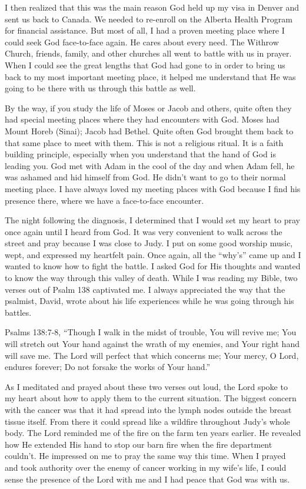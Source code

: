 \documentclass[twoside, 12pt]{book}
\begin{document}
I then realized that this was the main reason God held up my visa in Denver and sent us back to Canada. We needed to re-enroll on the Alberta Health Program for financial assistance. But most of all, I had a proven meeting place where I could seek God face-to-face again. He cares about every need. The Withrow Church, friends, family, and other churches all went to battle with us in prayer. When I could see the great lengths that God had gone to in order to bring us back to my most important meeting place, it helped me understand that He was going to be there with us through this battle as well. 

By the way, if you study the life of Moses or Jacob and others, quite often they had special meeting places where they had encounters with God. Moses had Mount Horeb (Sinai); Jacob had Bethel. Quite often God brought them back to that same place to meet with them. This is not a religious ritual. It is a faith building principle, especially when you understand that the hand of God is leading you. God met with Adam in the cool of the day and when Adam fell, he was ashamed and hid himself from God. He didn’t want to go to their normal meeting place. I have always loved my meeting places with God because I find his presence there, where we have a face-to-face encounter.

The night following the diagnosis, I determined that I would set my heart to pray once again until I heard from God. It was very convenient to walk across the street and pray because I was close to Judy. I put on some good worship music, wept, and expressed my heartfelt pain. Once again, all the “why’s” came up and I wanted to know how to fight the battle. I asked God for His thoughts and wanted to know the way through this valley of death. While I was reading my Bible, two verses out of Psalm 138 captivated me. I always appreciated the way that the psalmist, David, wrote about his life experiences while he was going through his battles.

Psalms 138:7-8, “Though I walk in the midst of trouble, You will revive me; You will stretch out Your hand against the wrath of my enemies, and Your right hand will save me. The Lord will perfect that which concerns me; Your mercy, O Lord, endures forever; Do not forsake the works of Your hand.”

As I meditated and prayed about these two verses out loud, the Lord spoke to my heart about how to apply them to the current situation. The biggest concern with the cancer was that it had spread into the lymph nodes outside the breast tissue itself. From there it could spread like a wildfire throughout Judy’s whole body. The Lord reminded me of the fire on the farm ten years earlier. He revealed how He extended His hand to stop our barn fire when the fire department couldn’t. He impressed on me to pray the same way this time. When I prayed and took authority over the enemy of cancer working in my wife’s life, I could sense the presence of the Lord with me and I had peace that God was with us.
\end{document}
